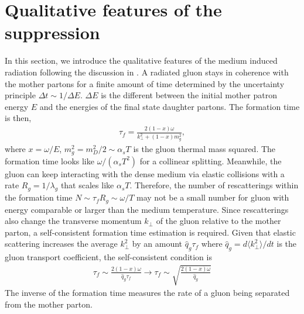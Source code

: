 \documentclass[aps, prc, reprint, amsmath, groupedaddress, nofootinbib]{revtex4-1}
\begin{document}
\section{Qualitative features of the suppression}\label{section:qual}
In this section, we introduce the qualitative features of the medium induced radiation following the discussion in \cite{Baier:1996kr}.
A radiated gluon stays in coherence with the mother partons for a finite amount of time determined by the uncertainty principle $\Delta t \sim 1/\Delta E$. 
$\Delta E$ is the different between the initial mother patron energy $E$ and the energies of the final state daughter partons.
The formation time is then,
\begin{eqnarray}\label{eq:tau_1}
\tau_f = \frac{2(1-x)\omega}{k_\perp^2+(1-x)m_g^2},
\end{eqnarray}
where $x = \omega/E$, $m_g^2=m_D^2/2 \sim \alpha_s T$ is the gluon thermal mass squared.
The formation time looks like $\omega/(\alpha_s T^2)$ for a collinear splitting.
Meanwhile, the gluon can keep interacting with the dense medium via elastic collisions with a rate $R_{g} = 1/\lambda_g$ that scales like $\alpha_s T$. 
Therefore, the number of rescatterings within the formation time $N \sim \tau_f R_g \sim \omega/T$ may not be a small number for gluon with energy comparable or larger than the medium temperature.
Since rescatterings also change the transverse momentum $k_\perp$ of the gluon relative to the mother parton, a self-consistent formation time estimation is required.
Given that elastic scattering increases the average $k_\perp^2$ by an amount $\hat{q}_g\tau_f$ where $\hat{q}_g = d\langle k_\perp^2\rangle/dt$ is the gluon transport coefficient, the self-consistent condition is
\begin{eqnarray}\label{eq:tau_n}
\tau_f \sim \frac{2(1-x)\omega}{\hat{q}_g\tau_f} \longrightarrow \tau_f \sim \sqrt{\frac{2(1-x)\omega}{\hat{q}_g}}
\end{eqnarray}
The inverse of the formation time measures the rate of a gluon being separated from the mother parton.
\end{document}

